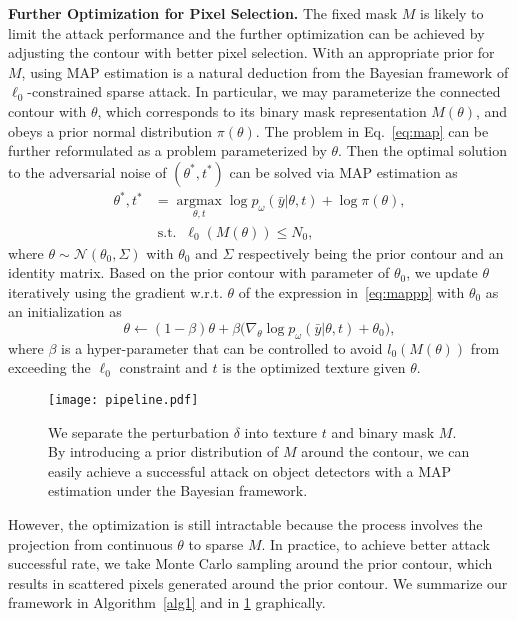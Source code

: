 \documentclass[times,twocolumn,final,authoryear]{elsarticle}
\begin{document}
\textbf{Further Optimization for Pixel Selection.} The fixed mask $M$ is likely to limit the attack performance and the further optimization can be achieved by adjusting the contour with better pixel selection. With an appropriate prior for $M$, using MAP estimation is a natural deduction from the Bayesian framework of $\ell_0$-constrained sparse attack. In particular, we may parameterize the connected contour with $\theta$, which corresponds to its binary mask representation $M(\theta)$, and obeys a prior normal distribution $\pi(\theta)$. The problem in Eq.~\eqref{eq:map} can be further reformulated as a problem parameterized by $\theta$. 
Then the optimal solution to the adversarial noise of $(\theta^\ast, t^\ast)$ can be solved via MAP estimation as  
\begin{equation}
\begin{split}
    \theta^\ast,t^\ast&=\mathop{\arg\max}\limits_{\theta,t} \log p_\omega(\bar{y}|\theta,t)+\log\pi(\theta),\\
    &\operatorname{ s.t. }\;\ell_0(M(\theta))\leq N_0,
\end{split}
\label{eq:mappp}
\end{equation}
where $\theta\sim\mathcal{N}(\theta_0,\Sigma)$ with $\theta_0$ and $\Sigma$ respectively being the prior contour and an identity matrix. Based on the prior contour with parameter of $\theta_0$, we update $\theta$ iteratively using the gradient w.r.t. $\theta$ of the expression in~\cref{eq:mappp} with $\theta_0$ as an initialization as
\begin{equation}
    \theta \leftarrow (1-\beta)\theta + \beta\big(\nabla_{\theta}\log p_\omega(\bar{y}|\theta,t)+\theta_0\big),
\end{equation}
where $\beta$ is a hyper-parameter that can be controlled to avoid $l_0(M(\theta))$ from exceeding the $\ell_0$ constraint and $t$ is the optimized texture given $\theta$. 
\begin{figure}[!t]
    \centering
    \texttt{[image: pipeline.pdf]}
    \caption{We separate the perturbation $\delta$ into texture $t$ and binary mask $M$. By introducing a prior distribution of $M$ around the contour, we can easily achieve a successful attack on object detectors with a MAP estimation under the Bayesian framework.
    }
    \label{fig:pipeline}
\end{figure}

However, the optimization is still intractable because the process involves the projection from continuous $\theta$ to sparse $M$. In practice, to achieve better attack successful rate, we take Monte Carlo sampling around the prior contour, which results in scattered pixels generated around the prior contour. We summarize our framework in Algorithm~\ref{alg1} and in \cref{fig:pipeline} graphically. 
\end{document}
